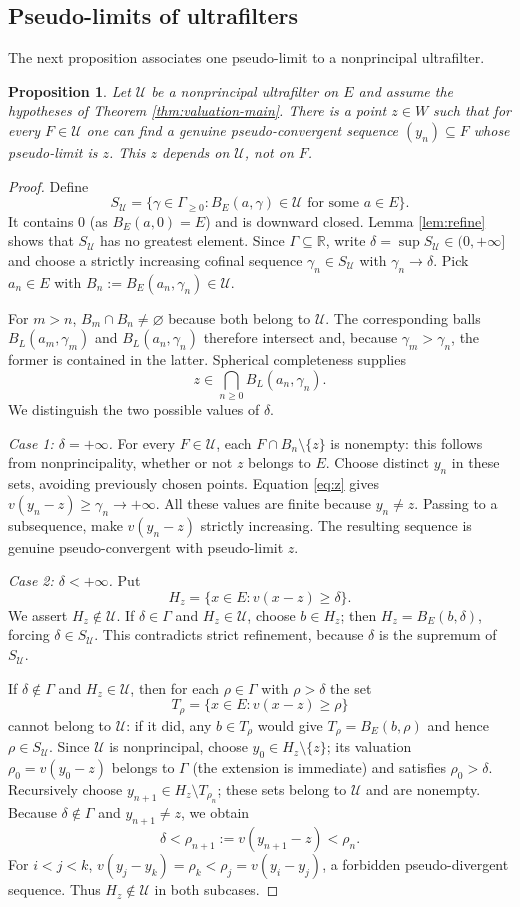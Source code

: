 \documentclass[11pt]{amsart}
\newtheorem{proposition}[theorem]{Proposition}
\theoremstyle{definition}
\theoremstyle{remark}
\newcommand{\U}{\mathcal U}
\newcommand{\g}{\Gamma}
\begin{document}
\subsection{Pseudo-limits of ultrafilters}\label{sec:limit}


The next proposition associates one pseudo-limit to a nonprincipal ultrafilter.
\begin{proposition}\label{prop:limit}
Let $\U$ be a nonprincipal ultrafilter on $E$ and assume the hypotheses of Theorem \ref{thm:valuation-main}. There is a point $z\in W$ such that for \emph{every} $F\in\U$ one can find a genuine pseudo-convergent sequence $(y_n)\subseteq F$ whose pseudo-limit is $z$. This $z$ depends on $\U$, not on $F$.
\end{proposition}
\begin{proof}
Define
\[
 S_{\U}=\{\gamma\in\g_{\geq0}:B_E(a,\gamma)\in\U\text{ for some }a\in E\}.
\]
It contains $0$ (as $B_E(a,0)=E$) and is downward closed. Lemma \ref{lem:refine} shows that $S_{\U}$ has no greatest element. Since $\g\subseteq\mathbb R$, write $\delta=\sup S_{\U}\in(0,+\infty]$ and choose a strictly increasing cofinal sequence $\gamma_n\in S_{\U}$ with $\gamma_n\to\delta$. Pick $a_n\in E$ with $B_n:=B_E(a_n,\gamma_n)\in\U$.

For $m>n$, $B_m\cap B_n\ne\varnothing$ because both belong to $\U$. The corresponding balls $B_L(a_m,\gamma_m)$ and $B_L(a_n,\gamma_n)$ therefore intersect and, because $\gamma_m>\gamma_n$, the former is contained in the latter. Spherical completeness supplies
\[
 z\in\bigcap_{n\geq0}B_L(a_n,\gamma_n).
 \tag{4.1}\label{eq:z}
\]
We distinguish the two possible values of $\delta$.

\emph{Case 1: $\delta=+\infty$.} For every $F\in\U$, each $F\cap B_n\setminus\{z\}$ is nonempty: this follows from nonprincipality, whether or not $z$ belongs to $E$. Choose distinct $y_n$ in these sets, avoiding previously chosen points. Equation \eqref{eq:z} gives $v(y_n-z)\geq\gamma_n\to+\infty$. All these values are finite because $y_n\ne z$. Passing to a subsequence, make $v(y_n-z)$ strictly increasing. The resulting sequence is genuine pseudo-convergent with pseudo-limit $z$.

\emph{Case 2: $\delta<+\infty$.} Put
\[
 H_z=\{x\in E:v(x-z)\geq\delta\}.
\]
We assert $H_z\notin\U$. If $\delta\in\g$ and $H_z\in\U$, choose $b\in H_z$; then $H_z=B_E(b,\delta)$, forcing $\delta\in S_{\U}$. This contradicts strict refinement, because $\delta$ is the supremum of $S_{\U}$.

If $\delta\notin\g$ and $H_z\in\U$, then for each $\rho\in\g$ with $\rho>\delta$ the set
\[
 T_\rho=\{x\in E:v(x-z)\geq\rho\}
\]
cannot belong to $\U$: if it did, any $b\in T_\rho$ would give $T_\rho=B_E(b,\rho)$ and hence $\rho\in S_{\U}$. Since $\U$ is nonprincipal, choose $y_0\in H_z\setminus\{z\}$; its valuation $\rho_0=v(y_0-z)$ belongs to $\g$ (the extension is immediate) and satisfies $\rho_0>\delta$. Recursively choose $y_{n+1}\in H_z\setminus T_{\rho_n}$; these sets belong to $\U$ and are nonempty. Because $\delta\notin\g$ and $y_{n+1}\not=z$, we obtain
\[
 \delta<\rho_{n+1}:=v(y_{n+1}-z)<\rho_n.
\]
For $i<j<k$, $v(y_j-y_k)=\rho_k<\rho_j=v(y_i-y_j)$, a forbidden pseudo-divergent sequence. Thus $H_z\notin\U$ in both subcases.


\end{proof}
\end{document}
